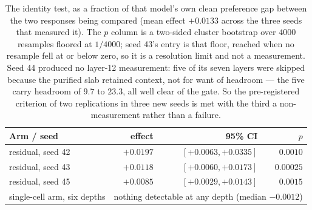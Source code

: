 \begin{table}[htbp]
\centering
\begin{tabular}{lrrr}
\toprule
Arm / seed & effect & 95\% CI & $p$ \\
\midrule
residual, seed 42 & $+0.0197$ & $[+0.0063, +0.0335]$ & $0.0010$ \\
residual, seed 43 & $+0.0118$ & $[+0.0060, +0.0173]$ & $0.00025$ \\
residual, seed 45 & $+0.0085$ & $[+0.0029, +0.0143]$ & $0.0015$ \\
\midrule
single-cell arm, six depths & \multicolumn{3}{l}{nothing detectable at any depth (median $-0.0012$)} \\
\bottomrule
\end{tabular}
\caption{The identity test, as a fraction of that model's own clean preference gap between the two
responses being compared (mean effect $+0.0133$ across the three seeds that measured it). The $p$
column is a two-sided cluster bootstrap over $4000$ resamples floored at $1/4000$; seed 43's entry
is that floor, reached when no resample fell at or below zero, so it is a resolution limit and not
a measurement. Seed 44
produced no layer-12 measurement: five of its seven layers were skipped because the purified slab
retained context, not for want of headroom --- the five carry headroom of $9.7$ to $23.3$, all well
clear of the gate. So the pre-registered criterion of two replications in three new seeds is met
with the third a non-measurement rather than a failure.}
\label{tab:identity}
\end{table}

